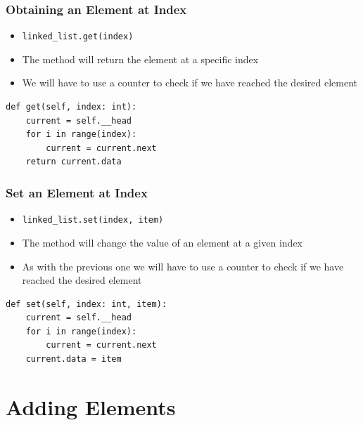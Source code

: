 \documentclass[11pt]{beamer}
\begin{document}
	\begin{frame}[fragile]
		\frametitle{Obtaining an Element at Index}
		\begin{itemize}
			\item \lstinline|linked_list.get(index)|
			\item The method will return the element at a specific index
			\item We will have to use a counter to check if we have reached the desired element
		\end{itemize}
		\vspace{0.5cm}
        \pause
\begin{lstlisting}
def get(self, index: int):
	current = self.__head
	for i in range(index):
		current = current.next
	return current.data
\end{lstlisting}
	\end{frame}

	\begin{frame}[fragile]
	\frametitle{Set an Element at Index}
	\begin{itemize}
		\item \lstinline|linked_list.set(index, item)|
		\item The method will change the value of an element at a given index
		\item As with the previous one we will have to use a counter to check if we have reached the desired element
	\end{itemize}
	\vspace{0.5cm}
    \pause
\begin{lstlisting}
def set(self, index: int, item):
	current = self.__head
	for i in range(index):
		current = current.next
	current.data = item
\end{lstlisting}
\end{frame}


\section{Adding Elements}
\end{document}
